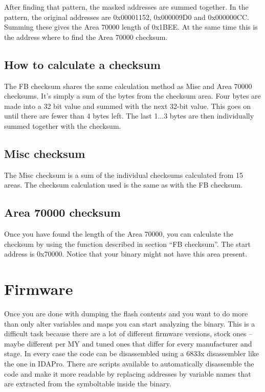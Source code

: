 \documentclass[11pt,a4paper]{book}
\begin{document}
After finding that pattern, the masked addresses are summed together. In the pattern, the original
addresses are 0x00001152, 0x000009D0 and 0x000000CC. Summing these gives the Area 70000
length of 0x1BEE. At the same time this is the address where to find the Area 70000 checksum.

\section{How to calculate a checksum}
The FB checksum shares the same calculation method as Misc and Area 70000 checksums. It's simply
a sum of the bytes from the checksum area. Four bytes are made into a 32 bit value and summed
with the next 32-bit value. This goes on until there are fewer than 4 bytes left. The last 1...3 bytes are
then individually summed together with the checksum.

\section{Misc checksum}
The Misc checksum is a sum of the individual checksums calculated from 15 areas. The checksum
calculation used is the same as with the FB checksum.

\section{Area 70000 checksum}
Once you have found the length of the Area 70000, you can calculate the checksum by using the
function described in section “FB checksum”. The start address is 0x70000. Notice that your binary
might not have this area present.

\chapter{Firmware}

Once you are done with dumping the flash contents and you want to do more than
only alter variables and maps you can start analyzing the binary. This is a
difficult task because there are a lot of different firmware versions, stock
ones – maybe different per MY and tuned ones that differ for every manufacturer
and stage. In every case the code can be disassembled using a 6833x disassembler
like the one in IDAPro. There are scripts available to automatically disassemble
the code and make it more readable by replacing addresses by variable names that
are extracted from the symboltable inside the binary.
\end{document}

